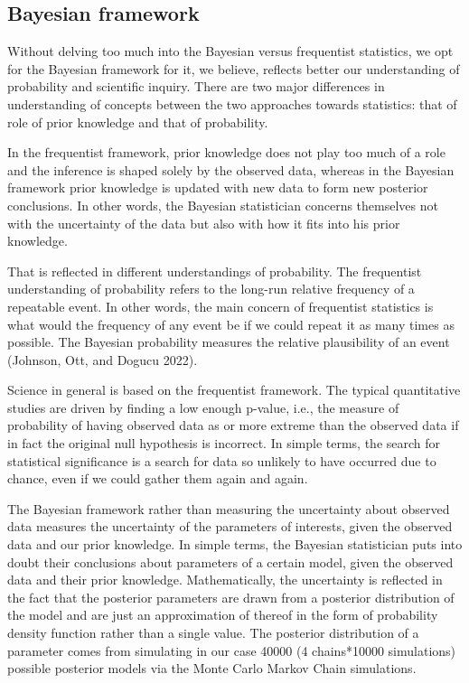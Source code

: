 \documentclass[
  11pt,
]{article}
\begin{document}
\hypertarget{bayesian-framework}{%
\subsection{Bayesian framework}\label{bayesian-framework}}

Without delving too much into the Bayesian versus frequentist
statistics, we opt for the Bayesian framework for it, we believe,
reflects better our understanding of probability and scientific inquiry.
There are two major differences in understanding of concepts between the
two approaches towards statistics: that of role of prior knowledge and
that of probability.

In the frequentist framework, prior knowledge does not play too much of
a role and the inference is shaped solely by the observed data, whereas
in the Bayesian framework prior knowledge is updated with new data to
form new posterior conclusions. In other words, the Bayesian
statistician concerns themselves not with the uncertainty of the data
but also with how it fits into his prior knowledge.

That is reflected in different understandings of probability. The
frequentist understanding of probability refers to the long-run relative
frequency of a repeatable event. In other words, the main concern of
frequentist statistics is what would the frequency of any event be if we
could repeat it as many times as possible. The Bayesian probability
measures the relative plausibility of an event (Johnson, Ott, and Dogucu
2022).

Science in general is based on the frequentist framework. The typical
quantitative studies are driven by finding a low enough p-value, i.e.,
the measure of probability of having observed data as or more extreme
than the observed data if in fact the original null hypothesis is
incorrect. In simple terms, the search for statistical significance is a
search for data so unlikely to have occurred due to chance, even if we
could gather them again and again.

The Bayesian framework rather than measuring the uncertainty about
observed data measures the uncertainty of the parameters of interests,
given the observed data and our prior knowledge. In simple terms, the
Bayesian statistician puts into doubt their conclusions about parameters
of a certain model, given the observed data and their prior knowledge.
Mathematically, the uncertainty is reflected in the fact that the
posterior parameters are drawn from a posterior distribution of the
model and are just an approximation of thereof in the form of
probability density function rather than a single value. The posterior
distribution of a parameter comes from simulating in our case 40000 (4
chains*10000 simulations) possible posterior models via the Monte Carlo
Markov Chain simulations.
\end{document}
